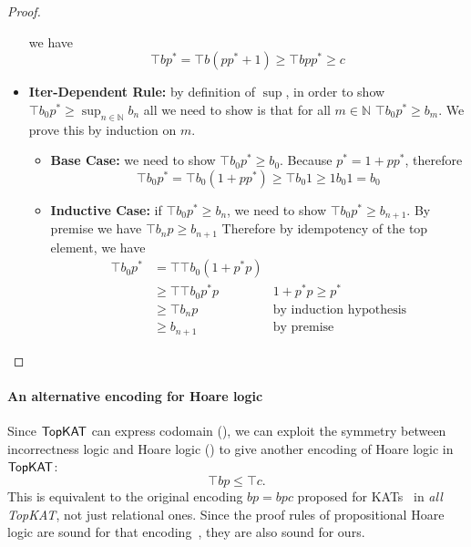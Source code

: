 \begin{proof}
\begin{itemize}
            we have 
            \[\top b {p}^* 
            = \top b (p {p}^* + 1)
            \geq \top b p {p}^* \geq c\]
        \item \textbf{Iter-Dependent Rule:}
            by definition of \(\sup\),
            in order to show \(\top b_{0} {p}^* \geq \sup_{n \in ℕ} b_{n}\)
            all we need to show is that for all \(m \in ℕ\)
            \(\top b_{0} {p}^* \geq b_{m}\).
            We prove this by induction on \(m\).
            \begin{itemize}
                \item \textbf{Base Case:}
                    we need to show \(\top b_{0} {p}^* \geq b_{0}\).
                    Because \({p}^* = 1 + p{p}^*\),
                    therefore 
                    \[\top b_{0} {p}^* 
                    = \top b_{0} (1 + p{p}^*)
                    \geq \top b_{0} 1 \geq 1 b_{0} 1 = b_{0}\]
                \item \textbf{Inductive Case:}
                    if \(\top b_{0} {p}^* \geq b_{n}\),
                    we need to show \(\top b_{0} {p}^* \geq b_{n+1}\).
                    By premise we have \(\top b_{n} p \geq b_{n + 1}\)
                    Therefore by idempotency of the top element,
                    we have 
                    \begin{align*}
                        \top b_{0} {p}^* 
                        & = \top \top b_{0} (1 + {p}^* p) \\
                        & \geq \top \top b_{0} {p}^* p
                        & 1 + {p}^* p \geq {p}^* \\
                        & \geq \top b_{n} p
                        & \text{by induction hypothesis} \\
                        & \geq b_{n+1}
                        & \text{by premise}
                    \end{align*}
            \end{itemize}   
    \end{itemize}
\end{proof}

\paragraph*{An alternative encoding for Hoare logic}

Since \(\mathsf{TopKAT}\) can express codomain (), we can exploit the symmetry between incorrectness logic and Hoare logic () to give another encoding of Hoare logic in \(\mathsf{TopKAT}\): 
\[\top b p \leq \top c.\] 
This is equivalent to the original encoding $bp = bpc$ proposed for KATs~\cite{Kozen_2000} in \emph{all TopKAT}, not just relational ones.  
Since the proof rules of propositional Hoare logic are sound for that encoding~\cite[Theorem~3.1]{Kozen_2000}, they are also sound for ours.

